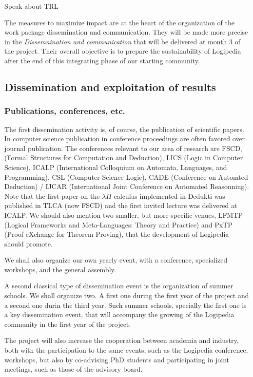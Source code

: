 {\color{red} Speak about TRL}

The measures to maximize impact are at the heart of the organization
of the work package dissemination and communication. They will be made
more precise in the {\em Dissemnination and communication} that will
be delivered at month 3 of the project. Their overall objective is to
prepare the sustainability of Logipedia after the end of this integrating
phase of our starting community.

\subsection{Dissemination and exploitation of results}
\label{sec:dissemination}

\subsubsection*{Publications, conferences, etc.}

The first dissemination activity is, of course, the publication of
scientific papers. In computer science publication in conference
proceedings are often favored over journal publication. The
conferences relevant to our area of research are FSCD, (Formal
Structures for Computation and Deduction), LICS (Logic in Computer
Science), ICALP (International Colloquium on Automata, Languages, and
Programming), CSL (Computer Science Logic), CADE (Conference on
Automted Deduction) / IJCAR (International Joint Conference on
Automated Reasonning). Note that the first paper on the $\lambda
\Pi$-calculus implemented in Dedukti was published in TLCA (now FSCD)
and the first invited lecture was delivered at ICALP. We should also
mention two smaller, but more specific venues, LFMTP (Logical
Frameworks and Meta-Languages: Theory and Practice) and PxTP (Proof
eXchange for Theorem Proving), that the development of Logipedia
should promote.

We shall also organize our own yearly event, with a conference,
specialized workshops, and the general assembly.

A second classical type of dissemination event is the organization of
summer schools. We shall organize two. A first one during the first
year of the project and a second one durin the third year. Such summer
schools, specially the first one is a key dissemination event, that
will accompany the growing of the Logipedia community in the first
year of the project.

The project will also increase the cooperation between academia and
industry, both with the participation to the same events, such as the
Logipedia conference, workshops, but also by co-advising PhD students
and participating in joint meetings, such as those of the advisory
board.

